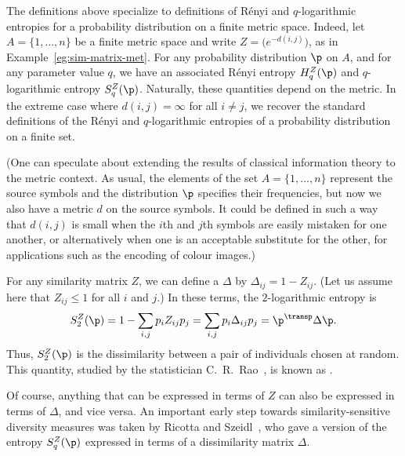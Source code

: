 \begin{example}
The definitions above specialize to definitions of R\'enyi and
$q$-logarithmic entropies for a probability distribution on a finite metric
space.  Indeed, let $A = \{1, \ldots, n\}$ be a finite metric space%
% 
%
% 
and write $Z = \bigl(e^{-d(i, j)}\bigr)$, as in
Example~\ref{eg:sim-matrix-met}.  For any probability distribution $\p$ on
$A$, and for any parameter value $q$, we have an associated R\'enyi entropy
$H_q^Z(\p)$ and $q$-logarithmic entropy $S_q^Z(\p)$.  Naturally, these
quantities depend on the metric.  In the extreme case where $d(i, j) =
\infty$ for all $i \neq j$, we recover the standard definitions of the R\'enyi
and $q$-logarithmic entropies of a probability distribution on a finite
set.

(One can speculate about extending the results of classical information
theory to the metric context.  As usual, the elements of the set $A = \{1,
\ldots, n\}$ represent the source symbols and the distribution $\p$
specifies their frequencies, but now we also have a metric $d$ on the
source symbols.  It could be defined in such a way that $d(i, j)$ is small
when the $i$th and $j$th symbols are easily mistaken for one another, or
alternatively when one is an acceptable substitute for the other, for
applications such as the encoding of colour images.)
\end{example}

\begin{example}
For any similarity matrix $Z$, we can define a 
$\Delta$ by $\Delta_{ij} = 1 - Z_{ij}$.  (Let us assume here that $Z_{ij}
\leq 1$ for all $i$ and $j$.)  In these terms, the $2$-logarithmic entropy
is
\[
S_2^Z(\p)
=
1 - \sum_{i, j} p_i Z_{ij} p_j
=
\sum_{i, j} p_i \Delta_{ij} p_j
=
\p^\transp \Delta \p.
\]
Thus, $S_2^Z(\p)$ is the dissimilarity between a pair of individuals
chosen at random.  This quantity, studied by the statistician
C.~R.~Rao~\cite{RaoDDC,RaoDIM}, is known as .%
%
%

Of course, anything that can be expressed in terms of $Z$ can also be
expressed in terms of $\Delta$, and vice versa.  An important early step
towards similarity-sensitive diversity measures was taken by Ricotta%
%
% 
and Szeidl~\cite{RiSzTUA},%
% 
% 
who gave a version of the entropy $S_q^Z(\p)$ expressed in terms of a
dissimilarity matrix $\Delta$.
\end{example}

